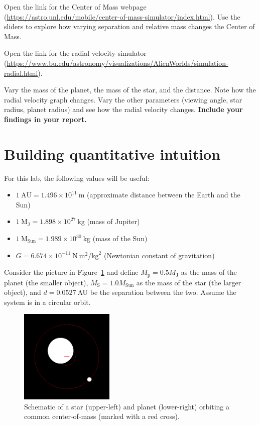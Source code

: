 \begin{steps}
	\item Open the link for the Center of Mass webpage (\url{https://astro.unl.edu/mobile/center-of-mass-simulator/index.html}). Use the sliders to explore how varying separation and relative mass changes the Center of Mass.
	
	\item Open the link for the radial velocity simulator (\url{https://www.bu.edu/astronomy/visualizations/AlienWorlds/simulation-radial.html}).
		
	\item Vary the mass of the planet, the mass of the star, and the distance. Note how the radial velocity graph changes. Vary the other parameters (viewing angle, star radius, planet radius) and see how the radial velocity changes. \textbf{Include your findings in your report.}		
\end{steps}

\section{Building quantitative intuition}

For this lab, the following values will be useful:
\begin{itemize}
	\item $1\:\textrm{AU} = 1.496 \times 10^{11}\:$m (approximate distance between the Earth and the Sun)
	
	\item $1\:\textrm{M}_\textrm{J} = 1.898 \times 10^{27}\:$kg (mass of Jupiter)
	
	\item $1\:\textrm{M}_\textrm{Sun} = 1.989 \times 10^{30}\:$kg (mass of the Sun)
	
	\item $G = 6.674 \times 10^{-11}\:\mathrm{N}\:\mathrm{m}^2/\mathrm{kg}^2$ (Newtonian constant of gravitation)
\end{itemize}

Consider the picture in Figure~\ref{rv:fig:two-body-cm} and define $M_\textrm{p} = 0.5 M_\textrm{J}$ as the mass of the planet (the smaller object),  $M_\textrm{S} = 1.0 M_\textrm{Sun}$ as the mass of the star (the larger object), and $d = 0.0527\:$AU be the separation between the two. Assume the system is in a circular orbit.

\begin{figure}
	\centering
	\includegraphics[width=0.4\textwidth]{radial-velocity/two-body-cm}
	\caption{Schematic of a star (upper-left) and planet (lower-right) orbiting a common center-of-mass (marked with a red cross).}\label{rv:fig:two-body-cm}
\end{figure}

